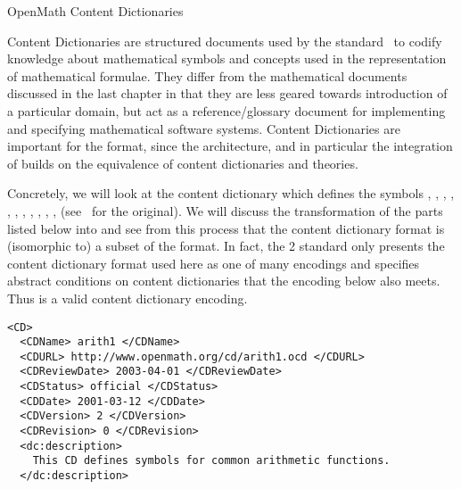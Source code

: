 
\begin{omgroup}[id=omcds]{OpenMath Content Dictionaries}

  Content Dictionaries are structured documents used by the {\openmath}
  standard~\cite{BusCapCar:2oms04} to codify knowledge about mathematical symbols and
  concepts used in the representation of mathematical formulae. They differ from the
  mathematical documents discussed in the last chapter in that they are less geared
  towards introduction of a particular domain, but act as a reference/glossary document
  for implementing and specifying mathematical software systems. Content Dictionaries are
  important for the {\omdoc} format, since the {\omdoc} architecture, and in particular
  the integration of {\openmath} builds on the equivalence of {\openmath} content
  dictionaries and {\omdoc} theories.

  Concretely, we will look at the content dictionary {} which defines
  the {\openmath} symbols {}, {}, {},
  {}, {}, {}, {},
  {}, {}, {}, {},
  {} (see~\cite{URL:omcd-core} for the original). We will discuss
  the transformation of the parts listed below into {\omdoc} and see from this process
  that the {\openmath} content dictionary format is (isomorphic to) a subset of the
  {\omdoc} format.  In fact, the {\openmath}2 standard only presents the content
  dictionary format used here as one of many encodings and specifies abstract conditions
  on content dictionaries that the {\omdoc} encoding below also meets. Thus {\omdoc} is a
  valid content dictionary encoding.

\begin{lstlisting}[language=omCD,label=lst:omcd,mathescape,
    caption={Part of the {\openmath} content dictionary {\snippet{arith1.ocd}}}]
<CD>
  <CDName> arith1 </CDName>
  <CDURL> http://www.openmath.org/cd/arith1.ocd </CDURL>
  <CDReviewDate> 2003-04-01 </CDReviewDate>
  <CDStatus> official </CDStatus>
  <CDDate> 2001-03-12 </CDDate>
  <CDVersion> 2 </CDVersion>
  <CDRevision> 0 </CDRevision>
  <dc:description> 
    This CD defines symbols for common arithmetic functions.
  </dc:description>


\end{lstlisting}
\end{omgroup}
